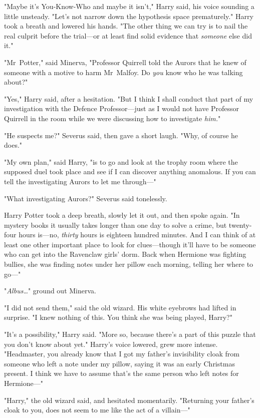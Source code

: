 "Maybe it's You-Know-Who and maybe it isn't," Harry said, his voice sounding a
little unsteady. "Let's not narrow down the hypothesis space prematurely."
Harry took a breath and lowered his hands. "The other thing we can try is to
nail the real culprit before the trial—or at least find solid evidence that
\emph{someone} else did it."

"Mr~Potter," said Minerva, "Professor Quirrell told the Aurors that he knew of
someone with a motive to harm Mr~Malfoy. Do \emph{you} know who he was talking
about?"

"Yes," Harry said, after a hesitation. "But I think I shall conduct that part
of my investigation with the Defence Professor—just as I would not have
Professor Quirrell in the room while we were discussing how to investigate
\emph{him.}"

"He suspects me?" Severus said, then gave a short laugh. "Why, of course he
does."

"My own plan," said Harry, "is to go and look at the trophy room where the supposed
duel took place and see if I can discover anything anomalous. If you can tell
the investigating Aurors to let me through—"

"What investigating Aurors?" Severus said tonelessly.

Harry Potter took a deep breath, slowly let it out, and then spoke again. "In
mystery books it usually takes longer than one day to solve a crime, but
twenty-four hours is—no, \emph{thirty} hours is eighteen hundred minutes. And
I can think of at least one other important place to look for clues—though
it'll have to be someone who can get into the Ravenclaw girls' dorm. Back when
Hermione was fighting bullies, she was finding notes under her pillow each
morning, telling her where to go—"

"\emph{Albus…}" ground out Minerva.

"I did not send them," said the old wizard. His white eyebrows had lifted in
surprise. "I knew nothing of this. You think she was being played, Harry?"

"It's a possibility," Harry said. "More so, because there's a part of this
puzzle that you don't know about yet." Harry's voice lowered, grew more
intense. "Headmaster, you already know that I got my father's invisibility
cloak from someone who left a note under my pillow, saying it was an early
Christmas present. I think we have to assume that's the same person who left
notes for Hermione—"

"Harry," the old wizard said, and hesitated momentarily. "Returning your
father's cloak to you, does not seem to me like the act of a villain—"

